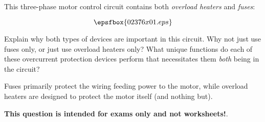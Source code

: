 

This three-phase motor control circuit contains both {\it overload heaters} and {\it fuses}:

$$\epsfbox{02376x01.eps}$$

Explain why both types of devices are important in this circuit.  Why not just use fuses only, or just use overload heaters only?  What unique functions do each of these overcurrent protection devices perform that necessitates them {\it both} being in the circuit?







Fuses primarily protect the wiring feeding power to the motor, while overload heaters are designed to protect the motor itself (and nothing but).







{\bf This question is intended for exams only and not worksheets!}.




